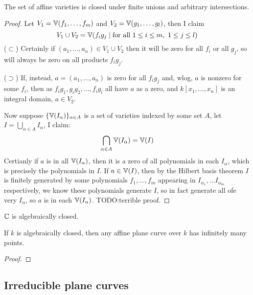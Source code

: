 \documentclass{article}
\begin{document}
\begin{lemma}
    The set of affine varieties is closed under finite unions and arbitrary intersections.\begin{proof}
        Let $V_1=\mathbb{V}(f_1,\ldots,f_m)$ and $V_2=\mathbb{V}(g_1,\ldots,g_l)$, then I claim \[
        V_1\cup V_2 = \mathbb{V}(f_ig_j \mid \text{for all } 1\leq i\leq m, \ 1\leq j\leq l)
        \]
        ($\subset$) Certainly if $(a_1,\ldots,a_n)\in V_1\cup V_2$ then it will be zero for all $f_i$ or all $g_j$, so will always be zero on all products $f_ig_j$.

        ($\supset$) If, instead, $a=(a_1,\ldots,a_n)$ is zero for all $f_ig_j$ and, wlog, $a$ is nonzero for some $f_i$, then as $f_ig_1,g_ig_2,\ldots,f_ig_l$ all have $a$ as a zero, and $k[x_1,\ldots,x_n]$ is an integral domain, $a\in V_2$.

        Now suppose $\{\mathbb{V}(I_\alpha)\}_{\alpha\in A}$ is a set of varieties indexed by some set $A$, let $I=\bigcup_{\alpha\in A}I_\alpha$, I claim: \[
        \bigcap_{\alpha\in A}\mathbb{V}(I_\alpha) = \mathbb{V}(I)
        \] Certianly if $a$ is in all $\mathbb{V}(I_\alpha)$, then it is a zero of all polynomials in each $I_\alpha$, which is precisely the polynomials in $I$. If $a\in\mathbb{V}(I)$, then by the Hilbert basis theorem $I$ is finitely generated by some polynomials $f_1,\ldots,f_m$ appearing in $I_{\alpha_1},\ldots I_{\alpha_m}$ respectively, we know these polynomials generate $I$, so in fact generate all ofe very $I_\alpha$, so $a$ is in each $\mathbb{V}(I_\alpha)$. TODO:terrible proof.
    \end{proof}
\end{lemma}

\begin{theorem}
    $\mathbb{C}$ is algebraically closed.
\end{theorem}

\begin{proposition}
    If $k$ is algebraically closed, then any affine plane curve over $k$ has infinitely many points.\begin{proof}
        
    \end{proof}
\end{proposition}

\subsection{Irreducible plane curves}
\end{document}
